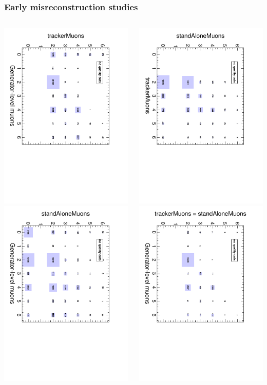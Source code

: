 \documentclass[compress]{beamer}
\begin{document}
\begin{frame}
\frametitle{Early misreconstruction studies}

\begin{columns}
\includegraphics[height=0.5\linewidth, angle=90]{correlation_hgentracker.pdf}
\includegraphics[height=0.5\linewidth, angle=90]{correlation_hgenstand.pdf}

\includegraphics[height=0.5\linewidth, angle=90]{correlation_htrackerstand.pdf}
\includegraphics[height=0.5\linewidth, angle=90]{correlation_hgenagree.pdf}


\end{columns}
\end{frame}
\end{document}
